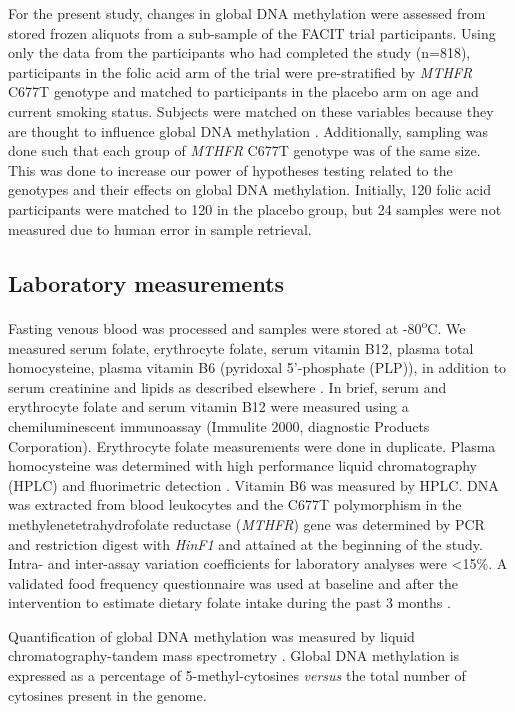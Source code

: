 \noindent For the present study, changes in global DNA methylation were assessed from stored frozen aliquots from a sub-sample of the FACIT trial participants. Using only the data from the participants who had completed the study (n=818), participants in the folic acid arm of the trial were pre-stratified by \emph{MTHFR} C677T genotype and matched to participants in the placebo arm on age and current smoking status. Subjects were matched on these variables because they are thought to influence global DNA methylation \cite{c420,c421,c422,c423,c424,c425}. Additionally, sampling was done such that each group of \emph{MTHFR} C677T genotype was of the same size. This was done to increase our power of hypotheses testing related to the genotypes and their effects on global DNA methylation. Initially, 120 folic acid participants were matched to 120 in the placebo group, but 24 samples were not measured due to human error in sample retrieval.

\subsection{Laboratory measurements} %
\noindent Fasting venous blood was processed and samples were stored at -80\textsuperscript{o}C. We measured serum folate, erythrocyte folate, serum vitamin B12, plasma total homocysteine, plasma vitamin B6 (pyridoxal 5'-phosphate (PLP)), in addition to serum creatinine and lipids as described elsewhere \cite{c416}. In brief, serum and erythrocyte folate and serum vitamin B12 were measured using a chemiluminescent immunoassay (Immulite\textsuperscript{\textregistered} 2000, diagnostic Products Corporation). Erythrocyte folate measurements were done in duplicate. Plasma homocysteine was determined with high performance liquid chromatography (HPLC) and fluorimetric detection \cite{c426}. Vitamin B6 was measured by HPLC. DNA was extracted from blood leukocytes and the C677T polymorphism in the methylenetetrahydrofolate reductase (\emph{MTHFR}) gene was determined by PCR and restriction digest with \emph{HinF1} and attained at the beginning of the study. Intra- and inter-assay variation coefficients for laboratory analyses were <15\%. A validated food frequency questionnaire was used at baseline and after the intervention to estimate dietary folate intake during the past 3 months \cite{c427}. 
 
\noindent Quantification of global DNA methylation was measured by liquid chromatography-tandem mass spectrometry \cite{c428}. Global DNA methylation is expressed as a percentage of 5-methyl-cytosines \emph{versus} the total number of cytosines present in the genome. 
 
